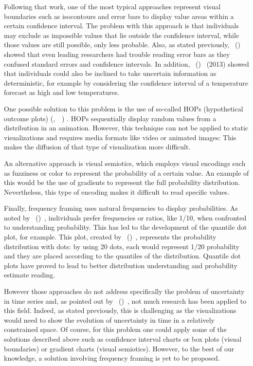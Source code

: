 \documentclass[a4paper,3p,sort&compress]{elsarticle}
\DeclareRobustCommand{\citeext}[1]{\citeauthor{#1},~\citeyear{#1}~\cite{#1}}
\DeclareRobustCommand{\citeextp}[1]{\citeauthor{#1}~(\citeyear{#1})~\cite{#1}}
\begin{document}
Following that work, one of the most typical approaches represent visual
boundaries such as isocontours and error bars to display value areas within a
certain confidence interval. The problem with this approach is that individuals
may exclude as impossible values that lie outside the confidence interval, while
those values are still possible, only less probable. Also, as stated previously,
\citeextp{belia_researchers_2005} showed that even leading researchers
had trouble reading error bars as they confused standard errors and confidence
intervals. In addition, \citeextp{joslyn_decisions_2013} (2013) showed
that individuals could also be inclined to take uncertain information as
deterministic, for example by considering the confidence interval of a
temperature forecast as high and low temperatures.

One possible solution to this problem is the use of so-called HOPs (hypothetical
outcome plots) (\citeext{hullman_hypothetical_2015}) . 
HOPs sequentially display random
values from a distribution in an animation. However, this technique can not be
applied to static visualizations and requires media formats like video or
animated images: This makes the diffusion of that type of visualization more
difficult.

An alternative approach is visual semiotics, which employs visual encodings such
as fuzziness or color to represent the probability of a certain value. An
example of this would be the use of gradients to represent the full probability
distribution. Nevertheless, this type of encoding makes it difficult to read
specific values.

Finally, frequency framing uses natural frequencies to display probabilities. As
noted by \citeextp{gigerenzer_psychology_1996}, individuals prefer frequencies
or ratios, like 1/10, when confronted to understanding probability. This has led
to the development of the quantile dot plot, for example. This plot, created by
 \citeextp{2016-when-ish-is-my-bus}, represents the probability
distribution with dots: by using 20 dots, each would represent 1/20 probability
and they are placed according to the quantiles of the distribution. Quantile dot
plots have proved to lead to better distribution understanding and probability
estimate reading.

However those approaches do not address specifically the problem of uncertainty
in time series and, as pointed out by 
\citeextp{leffrang_should_2021}, not much research has been applied to this field.
Indeed, as stated previously, this is challenging as the visualizations would
need to show the evolution of uncertainty in time in a relatively constrained
space. Of course, for this problem one could apply some of the solutions
described above such as confidence interval charts or box plots (visual
boundaries) or gradient charts (visual semiotics). However, to the best of our
knowledge, a solution involving frequency framing is yet to be proposed.
\end{document}

